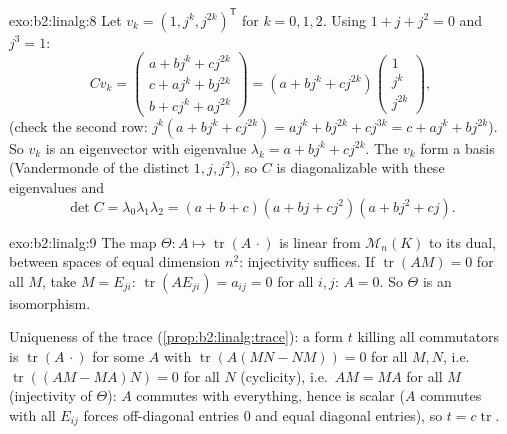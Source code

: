 \begin{solution}{exo:b2:linalg:8}
Let $v_k = (1, j^k, j^{2k})^{\mathsf T}$ for $k = 0, 1, 2$. Using $1
+ j + j^2 = 0$ and $j^3 = 1$:
\[
C v_k =
\begin{pmatrix}
a + b j^k + c j^{2k}\\
c + a j^k + b j^{2k}\\
b + c j^k + a j^{2k}
\end{pmatrix}
= (a + b j^k + c j^{2k})
\begin{pmatrix} 1\\ j^k\\ j^{2k}\end{pmatrix},
\]
(check the second row: $j^k(a + bj^k + cj^{2k}) = aj^k + bj^{2k} +
cj^{3k} = c + aj^k + bj^{2k}$). So $v_k$ is an eigenvector with
eigenvalue $\lambda_k = a + bj^k + cj^{2k}$. The $v_k$ form a basis
(Vandermonde of the distinct $1, j, j^2$), so $C$ is diagonalizable
with these eigenvalues and
\[
\det C = \lambda_0\lambda_1\lambda_2
= (a+b+c)(a + bj + cj^2)(a + bj^2 + cj).
\]
\end{solution}

\begin{solution}{exo:b2:linalg:9}
The map $\Theta \colon A \mapsto \operatorname{tr}(A\,\cdot)$ is
linear from $\mathcal{M}_n(K)$ to its dual, between spaces of equal
dimension $n^2$: injectivity suffices. If $\operatorname{tr}(AM) =
0$ for all $M$, take $M = E_{ji}$: $\operatorname{tr}(A E_{ji}) =
a_{ij} = 0$ for all $i, j$: $A = 0$. So $\Theta$ is an isomorphism.

Uniqueness of the trace (\cref{prop:b2:linalg:trace}): a form $t$
killing all commutators is $\operatorname{tr}(A\,\cdot)$ for some
$A$ with $\operatorname{tr}(A(MN - NM)) = 0$ for all $M, N$, i.e.\
$\operatorname{tr}((AM - MA)N) = 0$ for all $N$ (cyclicity), i.e.\
$AM = MA$ for all $M$ (injectivity of $\Theta$): $A$ commutes with
everything, hence is scalar ($A$ commutes with all $E_{ij}$ forces
off-diagonal entries $0$ and equal diagonal entries), so $t = c
\operatorname{tr}$.
\end{solution}

